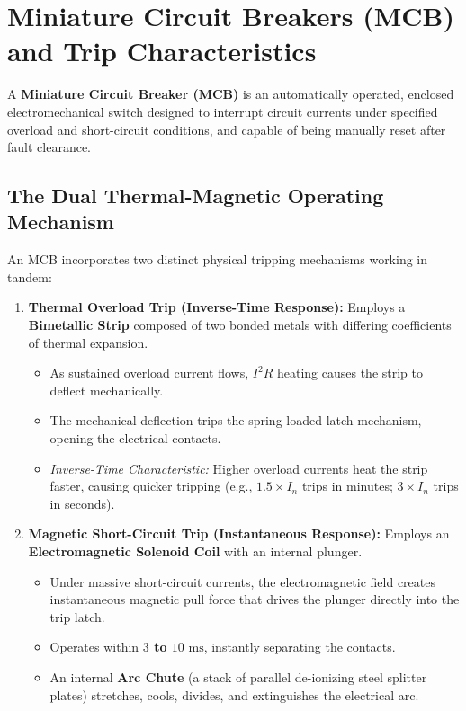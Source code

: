 \section{Miniature Circuit Breakers (MCB) and Trip Characteristics}
\label{sec:mcbs}

A \textbf{Miniature Circuit Breaker (MCB)} is an automatically operated, enclosed electromechanical switch designed to interrupt circuit currents under specified overload and short-circuit conditions, and capable of being manually reset after fault clearance.

\subsection{The Dual Thermal-Magnetic Operating Mechanism}
An MCB incorporates two distinct physical tripping mechanisms working in tandem:
\begin{enumerate}[label=\bfseries\arabic*.]
    \item \textbf{Thermal Overload Trip (Inverse-Time Response):} Employs a \textbf{Bimetallic Strip} composed of two bonded metals with differing coefficients of thermal expansion.
    \begin{itemize}
        \item As sustained overload current flows, $I^2R$ heating causes the strip to deflect mechanically.
        \item The mechanical deflection trips the spring-loaded latch mechanism, opening the electrical contacts.
        \item \textit{Inverse-Time Characteristic:} Higher overload currents heat the strip faster, causing quicker tripping (e.g., $1.5 \times I_n$ trips in minutes; $3 \times I_n$ trips in seconds).
    \end{itemize}
    \item \textbf{Magnetic Short-Circuit Trip (Instantaneous Response):} Employs an \textbf{Electromagnetic Solenoid Coil} with an internal plunger.
    \begin{itemize}
        \item Under massive short-circuit currents, the electromagnetic field creates instantaneous magnetic pull force that drives the plunger directly into the trip latch.
        \item Operates within \textbf{$3$ to $10\text{ ms}$}, instantly separating the contacts.
        \item An internal \textbf{Arc Chute} (a stack of parallel de-ionizing steel splitter plates) stretches, cools, divides, and extinguishes the electrical arc.
    \end{itemize}
\end{enumerate}

